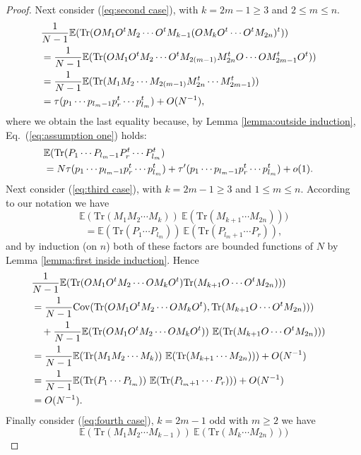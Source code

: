 \documentclass[11pt]{amsart}
\theoremstyle{definition}
\numberwithin{theorem}{section}
\newcommand{\cov}{\mathrm{Cov}}
\newcommand{\rE} {\mathbb{E}}
\newcommand{\Tr}{\mathrm{Tr}}
\begin{document}
\begin{proof}
Next consider (\ref{eq:second case}), with $k = 2m - 1 \geq 3$ and $2 \leq m \leq n$.
\begin{align*} \lefteqn{
\frac{1}{N - 1}\rE( \Tr(O M_1 O^t M_2 \cdots O^t M_{k-1} (O M_{k} O^t \cdots O^t M_{2n})^t ))} \\
& \mbox{} =
\frac{1}{N - 1}\rE( \Tr(O M_1 O^t M_2 \cdots O^t M_{2(m-1)} M_{2n}^t O \cdots O M_{2m-1}^t O^t)) \\
& \mbox{} =
\frac{1}{N - 1}\rE( \Tr(M_1 M_2 \cdots M_{2(m-1)} M_{2n}^t  \cdots  M_{2m-1}^t)) \\
& \mbox{} =
\tau(p_1 \cdots p_{l_m-1} p_r^t \cdots p_{l_m}^t ) + O(N^{-1}),
\end{align*}
where we obtain the last equality because, by Lemma
\ref{lemma:outside induction}, Eq.~(\ref{eq:assumption one})
holds:
\begin{align*}\lefteqn{
\rE(\Tr(P_1 \cdots P_{l_m-1} P_r^t \cdots P_{l_m}^t ) } \\
& =
N \tau(p_1 \cdots p_{l_m-1} p_r^t \cdots p_{l_m}^t )
+ 
\tau'(p_1 \cdots p_{l_m-1} p_r^t \cdots p_{l_m}^t )
+
o(1).
\end{align*}
Next consider (\ref{eq:third case}), with $k = 2m - 1 \geq
3$ and $1 \leq m \leq n$.  According to our notation we have
\[
\rE(\Tr(M_1 M_2 \cdots M_{k}))\ \rE(\Tr(M_{k+1}  \cdots  M_{2n}) ))
\]
\[
=
\rE(\Tr( P_1 \cdots P_{l_m}))\ \rE(\Tr( P_{l_m +1} \cdots P_{r})),
\]
and by induction (on $n$) both of these factors are bounded
functions of $N$ by Lemma \ref{lemma:first inside
  induction}. Hence
\begin{align*}\lefteqn{
\frac{1}{N - 1}
\rE( \Tr(O M_1 O^t M_2 \cdots O M_{k}O^t) \Tr(M_{k+1} O \cdots O^t M_{2n}) ))} \\
& =
\frac{1}{N - 1} \cov(\Tr(O M_1 O^t M_2 \cdots O M_{k}O^t), 
                     \Tr(M_{k+1} O \cdots O^t M_{2n}) )) \\
& \quad+
\frac{1}{N - 1} \rE(\Tr(O M_1 O^t M_2 \cdots O M_{k}O^t)) \
                 \rE(\Tr(M_{k+1} O \cdots O^t M_{2n}) )) \\
& =
\frac{1}{N - 1} \rE(\Tr(M_1 M_2 \cdots M_{k})) \
                 \rE(\Tr(M_{k+1}  \cdots  M_{2n}) )) + O(N^{-1}) \\
&=
                 \frac{1}{N - 1} \rE(\Tr(P_1 \cdots P_{l_m})) \
                 \rE(\Tr(P_{l_m+1}  \cdots  P_{r}) )) + O(N^{-1}) \\
& = O(N^{-1}).
\end{align*}
Finally consider (\ref{eq:fourth case}), $k = 2m - 1$ odd
with $m \geq 2$ we have
\[
\rE(\Tr(M_1 M_2 \cdots M_{k-1}))\ \rE(\Tr(M_{k}  \cdots  M_{2n}) ))
\]
\end{proof}
\end{document}
